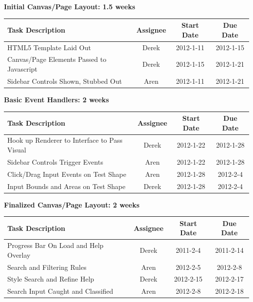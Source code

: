 \documentclass[12pt, letterpaper]{article}
\begin{document}
  \begin{center}
		{\bf Initial Canvas/Page Layout: 1.5 weeks}
    \begin{tabular}{| p{8.3cm} || c | c | c | }
      \hline
      Task Description & Assignee & Start Date & Due Date \\
      \hline
	    HTML5 Template Laid Out & Derek & 2012-1-11 & 2012-1-15 \\
	    Canvas/Page Elements Passed to Javascript & Derek & 2012-1-15 & 2012-1-21 \\
	    Sidebar Controls Shown, Stubbed Out & Aren & 2012-1-11 & 2012-1-21 \\
      \hline
    \end{tabular}
  \end{center}

  \begin{center}
		{\bf Basic Event Handlers: 2 weeks}
    \begin{tabular}{| p{8.3cm} || c | c | c | }
      \hline
      Task Description & Assignee & Start Date & Due Date \\
      \hline
	    Hook up Renderer to Interface to Pass Visual & Derek & 2012-1-22 & 2012-1-28 \\
 	    Sidebar Controls Trigger Events & Aren & 2012-1-22 & 2012-1-28 \\
	    Click/Drag Input Events on Test Shape & Aren & 2012-1-28 & 2012-2-4 \\
	    Input Bounds and Areas on Test Shape & Derek & 2012-1-28 & 2012-2-4 \\
      \hline
    \end{tabular}
  \end{center}

  \begin{center}
		{\bf Finalized Canvas/Page Layout: 2 weeks}
    \begin{tabular}{| p{8.3cm} || c | c | c | }
      \hline
      Task Description & Assignee & Start Date & Due Date \\
      \hline
		Progress Bar On Load and Help Overlay & Derek & 2011-2-4 & 2011-2-14 \\
	    Search and Filtering Rules & Aren & 2012-2-5 & 2012-2-8 \\
	    Style Search and Refine Help & Derek & 2012-2-15 & 2012-2-17 \\
	    Search Input Caught and Classified & Aren & 2012-2-8 & 2012-2-18 \\
      \hline
    \end{tabular}
  \end{center}
\end{document}
